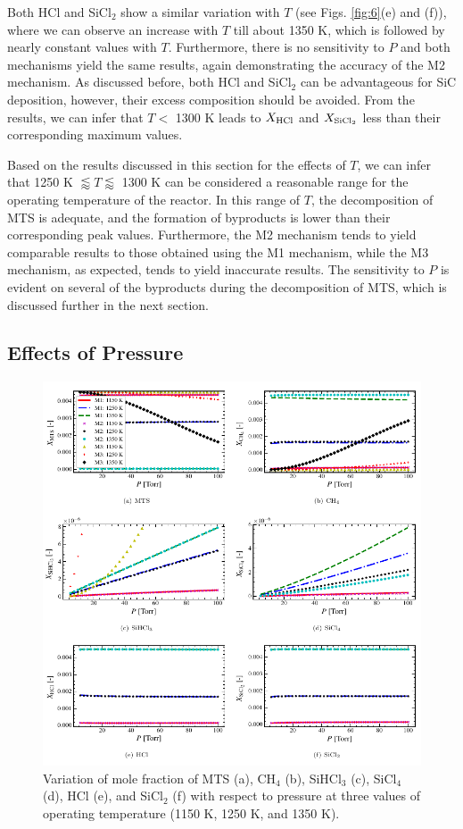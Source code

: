 \documentclass[final, letterpaper, square, comma, numbers, sort&compress]{elsarticle}
\begin{document}
Both HCl and SiCl$_2$ show a similar variation with $T$ (see Figs. \ref{fig:6}(e) and (f)), where we can observe an increase with $T$ till about 1350 K, which is followed by nearly constant values with $T$. Furthermore, there is no sensitivity to $P$ and both mechanisms yield the same results, again demonstrating the accuracy of the M2 mechanism. As discussed before, both HCl and SiCl$_2$ can be advantageous for SiC deposition, however, their excess composition should be avoided. From the results, we can infer that $T <$ 1300 K leads to $X_{\rm HCl}$ and $X_{\rm SiCl_2}$ less than their corresponding maximum values.

Based on the results discussed in this section for the effects of $T$, we can infer that 1250 K $\lessapprox T \lessapprox$ 1300 K can be considered a reasonable range for the operating temperature of the reactor. In this range of $T$, the decomposition of MTS is adequate, and the formation of byproducts is lower than their corresponding peak values. Furthermore, the M2 mechanism tends to yield comparable results to those obtained using the M1 mechanism, while the M3 mechanism, as expected, tends to yield inaccurate results. The sensitivity to $P$ is evident on several of the byproducts during the decomposition of MTS, which is discussed further in the next section.

\subsection{Effects of Pressure}
\label{S:4.2}
\begin{figure}[p]
    \centering\includegraphics[width=\textwidth]{ph-fig7.png}
    \caption{Variation of mole fraction of MTS (a), CH$_4$ (b), SiHCl$_3$ (c), SiCl$_4$ (d), HCl (e), and SiCl$_2$ (f) with respect to pressure at three values of operating temperature (1150 K, 1250 K, and 1350 K).}
    \label{fig:7}
\end{figure}
\end{document}
